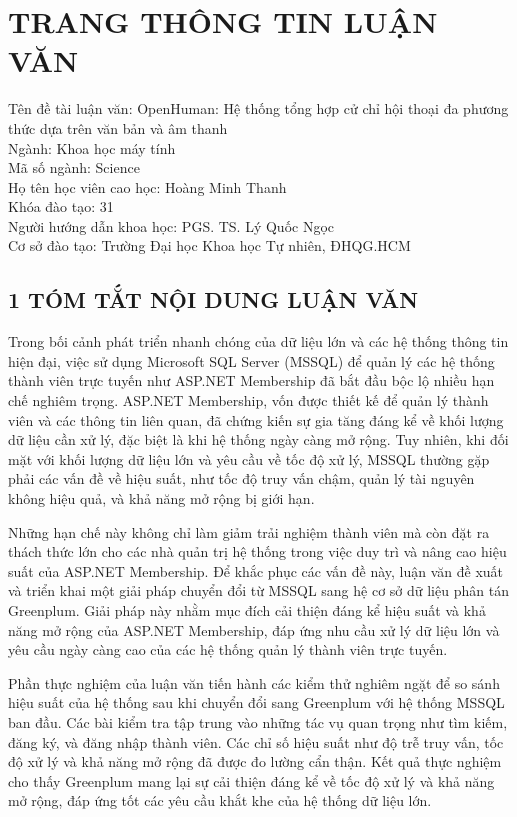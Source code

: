 
{}
\section*{\centering \MakeUppercase{TRANG THÔNG TIN LUẬN VĂN}}


Tên đề tài luận văn: OpenHuman: Hệ thống tổng hợp cử chỉ hội thoại đa phương thức dựa trên văn bản và âm thanh \\
Ngành: Khoa học máy tính \\
Mã số ngành:  Science \\
Họ tên học viên cao học: Hoàng Minh Thanh \\
Khóa đào tạo: 31 \\
Người hướng dẫn khoa học: PGS. TS. Lý Quốc Ngọc \\
Cơ sở đào tạo: Trường Đại học Khoa học Tự nhiên, ĐHQG.HCM


\subsection*{1 TÓM TẮT NỘI DUNG LUẬN VĂN}
Trong bối cảnh phát triển nhanh chóng của dữ liệu lớn và các hệ thống thông tin hiện đại, việc sử dụng Microsoft SQL Server (MSSQL) để quản lý các hệ thống thành viên trực tuyến như ASP.NET Membership đã bắt đầu bộc lộ nhiều hạn chế nghiêm trọng. ASP.NET Membership, vốn được thiết kế để quản lý thành viên và các thông tin liên quan, đã chứng kiến sự gia tăng đáng kể về khối lượng dữ liệu cần xử lý, đặc biệt là khi hệ thống ngày càng mở rộng. Tuy nhiên, khi đối mặt với khối lượng dữ liệu lớn và yêu cầu về tốc độ xử lý, MSSQL thường gặp phải các vấn đề về hiệu suất, như tốc độ truy vấn chậm, quản lý tài nguyên không hiệu quả, và khả năng mở rộng bị giới hạn.

Những hạn chế này không chỉ làm giảm trải nghiệm thành viên mà còn đặt ra thách thức lớn cho các nhà quản trị hệ thống trong việc duy trì và nâng cao hiệu suất của ASP.NET Membership. Để khắc phục các vấn đề này, luận văn đề xuất và triển khai một giải pháp chuyển đổi từ MSSQL sang hệ cơ sở dữ liệu phân tán Greenplum. Giải pháp này nhằm mục đích cải thiện đáng kể hiệu suất và khả năng mở rộng của ASP.NET Membership, đáp ứng nhu cầu xử lý dữ liệu lớn và yêu cầu ngày càng cao của các hệ thống quản lý thành viên trực tuyến.


Phần thực nghiệm của luận văn tiến hành các kiểm thử nghiêm ngặt để so sánh hiệu suất của hệ thống sau khi chuyển đổi sang Greenplum với hệ thống MSSQL ban đầu. Các bài kiểm tra tập trung vào những tác vụ quan trọng như tìm kiếm, đăng ký, và đăng nhập thành viên. Các chỉ số hiệu suất như độ trễ truy vấn, tốc độ xử lý và khả năng mở rộng đã được đo lường cẩn thận. Kết quả thực nghiệm cho thấy Greenplum mang lại sự cải thiện đáng kể về tốc độ xử lý và khả năng mở rộng, đáp ứng tốt các yêu cầu khắt khe của hệ thống dữ liệu lớn.

